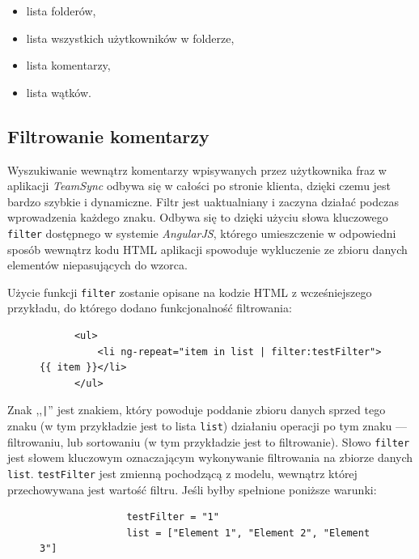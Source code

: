 \begin{itemize}[noitemsep]
  \item lista folderów,
  \item lista wszystkich użytkowników w folderze,
  \item lista komentarzy,
  \item lista wątków.
\end{itemize}


\subsection{Filtrowanie komentarzy}

Wyszukiwanie wewnątrz komentarzy wpisywanych przez użytkownika fraz w aplikacji \emph{TeamSync} odbywa się w całości po stronie klienta, dzięki czemu jest bardzo szybkie i dynamiczne. Filtr jest uaktualniany i zaczyna działać podczas wprowadzenia każdego znaku. Odbywa się to dzięki użyciu słowa kluczowego \texttt{filter} dostępnego w systemie \emph{AngularJS}, którego umieszczenie w odpowiedni sposób wewnątrz kodu HTML aplikacji spowoduje wykluczenie ze zbioru danych elementów niepasujących do wzorca.

Użycie funkcji \texttt{filter} zostanie opisane na kodzie HTML z wcześniejszego przykładu, do którego dodano funkcjonalność filtrowania:

\begin{figure}[htb]
\begin{verbatim}
      <ul>
          <li ng-repeat="item in list | filter:testFilter">{{ item }}</li>
      </ul>
\end{verbatim}
\end{figure}

Znak ,,\texttt{|}'' jest znakiem, który powoduje poddanie zbioru danych sprzed tego znaku (w tym przykładzie jest to lista \texttt{list}) działaniu operacji po tym znaku --- filtrowaniu, lub sortowaniu (w tym przykładzie jest to filtrowanie). Słowo \texttt{filter} jest słowem kluczowym oznaczającym wykonywanie filtrowania na zbiorze danych \texttt{list}. \texttt{testFilter} jest zmienną pochodzącą z modelu, wewnątrz której przechowywana jest wartość filtru. Jeśli byłby spełnione poniższe warunki:

\begin{figure}[htb]
\begin{verbatim}
               testFilter = "1"
               list = ["Element 1", "Element 2", "Element 3"]
\end{verbatim}
\end{figure}

